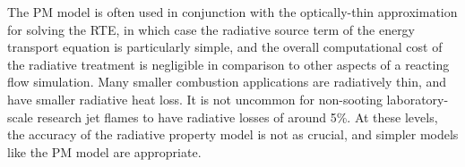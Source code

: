 \documentclass[preprint,12pt]{elsarticle}
\begin{document}
The PM model is often used in conjunction with the optically-thin approximation for solving the RTE, in which case the radiative source term of the energy transport equation is particularly simple, and the overall computational cost of the radiative treatment is negligible in comparison to other aspects of a reacting flow simulation. Many smaller combustion applications are radiatively thin, and have smaller radiative heat loss. It is not uncommon for non-sooting laboratory-scale research jet flames to have radiative losses of around 5\%. At these levels, the accuracy of the radiative property model is not as crucial, and simpler models like the PM model are appropriate. 





\end{document}
